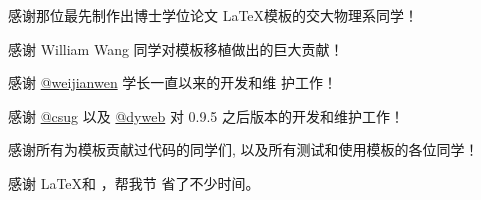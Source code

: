 
\begin{acknowledgements}
  感谢那位最先制作出博士学位论文 \LaTeX 模板的交大物理系同学！

  感谢 William Wang 同学对模板移植做出的巨大贡献！

  感谢 \href{https://github.com/weijianwen}{@weijianwen} 学长一直以来的开发和维
  护工作！

  感谢 \href{https://github.com/csug}{@csug} 以及
   \href{https://github.com/dyweb}{@dyweb} 对 0.9.5 之后版本的开发和维护工作！

  感谢所有为模板贡献过代码的同学们, 以及所有测试和使用模板的各位同学！

  感谢 \LaTeX 和 \href{https://github.com/csug/CSUThesis}{\csuthesis}，帮我节
  省了不少时间。
\end{acknowledgements}
